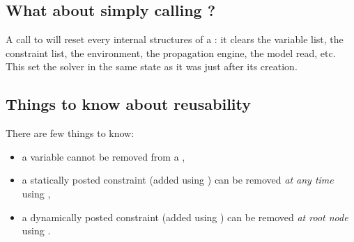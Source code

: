 \subsection{What about simply calling ?}

A call to  will reset every internal structures of a : it clears the variable list, the constraint list, the environment, the propagation engine, the model read, etc.
This set the solver in the same state as it was just after its creation.

\subsection{Things to know about  reusability}

There are few things to know:
\begin{itemize}
\item a variable cannot be removed from a ,
\item a statically posted constraint (added using ) can be removed \textit{at any time} using ,
\item a dynamically posted constraint (added using ) can be removed \textit{at root node} using .
\end{itemize}


%	
%  
%  
